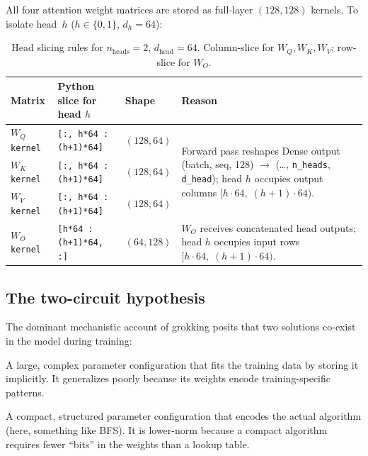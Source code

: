 \documentclass[11pt, a4paper]{article}
\begin{document}
All four attention weight matrices are stored as full-layer $(128, 128)$
kernels. To isolate head~$h$ ($h \in \{0, 1\}$, $d_h = 64$):

\begin{table}[H]
\centering
\begin{tabular}{@{}llll@{}}
\toprule
Matrix & Python slice for head $h$ & Shape & Reason \\
\midrule
$W_Q$ \texttt{kernel} & \texttt{[:, h*64 : (h+1)*64]} & $(128, 64)$ &
  \multirow{3}{*}{\parbox{5.5cm}{Forward pass reshapes Dense output
  (batch, seq, 128) $\to$ (\ldots, \texttt{n\_heads}, \texttt{d\_head});
  head $h$ occupies output columns $[h{\cdot}64,\;(h{+}1){\cdot}64)$.}} \\
$W_K$ \texttt{kernel} & \texttt{[:, h*64 : (h+1)*64]} & $(128, 64)$ & \\
$W_V$ \texttt{kernel} & \texttt{[:, h*64 : (h+1)*64]} & $(128, 64)$ & \\
\midrule
$W_O$ \texttt{kernel} & \texttt{[h*64 : (h+1)*64, :]} & $(64, 128)$ &
  $W_O$ receives concatenated head outputs;
  head $h$ occupies input rows $[h{\cdot}64,\;(h{+}1){\cdot}64)$. \\
\bottomrule
\end{tabular}
\caption{Head slicing rules for $n_{\text{heads}}=2$, $d_{\text{head}}=64$.
  Column-slice for $W_Q, W_K, W_V$; row-slice for $W_O$.}
\end{table}

\subsection{The two-circuit hypothesis}
\label{sec:two-circuit}

The dominant mechanistic account of grokking posits that two solutions
co-exist in the model during training:

\begin{description}[noitemsep]
  \item[Memorization circuit (high norm).] A large, complex parameter
    configuration that fits the training data by storing it implicitly. It
    generalizes poorly because its weights encode training-specific patterns.
  \item[Generalization circuit (low norm).] A compact, structured parameter
    configuration that encodes the actual algorithm (here, something like BFS).
    It is lower-norm because a compact algorithm requires fewer ``bits'' in
    the weights than a lookup table.
\end{description}
\end{document}
